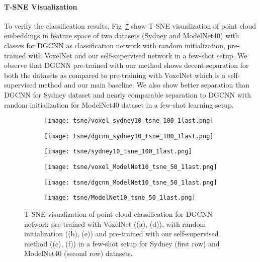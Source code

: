 \documentclass{article}
\begin{document}
\paragraph{T-SNE Visualization}
To verify the classification results, Fig~\ref{fig:tsne} show T-SNE visualization of point cloud embeddings in feature space of two datasets (Sydney and ModelNet40) with  classes for DGCNN as classification network with random initialization, pre-trained with VoxelNet and our self-supervised network in a few-shot setup. We observe that DGCNN pre-trained with our method shows decent separation for both the datasets as compared to pre-training with VoxelNet which is a self-supervised method and our main baseline. We also show better separation than DGCNN for Sydney dataset and nearly comparable separation to DGCNN with random initialization for ModelNet40 dataset in a few-shot learning setup.

\begin{figure}
	\centering
	\begin{subfigure}{.32\textwidth}
		\centering
		\texttt{[image: tsne/voxel\_sydney10\_tsne\_100\_1last.png]}
		\caption{}
		\label{fig:tsne1}
	\end{subfigure}\begin{subfigure}{.32\textwidth}
		\centering
		\texttt{[image: tsne/dgcnn\_sydney10\_tsne\_100\_1last.png]}
		\caption{}
		\label{fig:tsne2}
    \end{subfigure}\begin{subfigure}{.32\textwidth}
		\centering
		\texttt{[image: tsne/sydney10\_tsne\_100\_1last.png]}
		\caption{}
		\label{fig:tsne3}
	\end{subfigure}

	\begin{subfigure}{.32\textwidth}
		\centering
		\texttt{[image: tsne/voxel\_ModelNet10\_tsne\_50\_1last.png]}
		\caption{}
		\label{fig:tsne4}
    \end{subfigure}\begin{subfigure}{.32\textwidth}
		\centering
		\texttt{[image: tsne/dgcnn\_ModelNet10\_tsne\_50\_1last.png]}
		\caption{}
		\label{fig:tsne5}
    \end{subfigure}\begin{subfigure}{.32\textwidth}
		\centering
		\texttt{[image: tsne/ModelNet10\_tsne\_50\_1last.png]}
		\caption{}
		\label{fig:tsne6}
	\end{subfigure}\caption{T-SNE visualization of point cloud classification for DGCNN network pre-trained with VoxelNet ((a), (d)), with random initialization ((b), (e)) and pre-trained with our self-supervised method ((c), (f)) in a few-shot setup for Sydney (first row) and ModelNet40 (second row) datasets. }
	\label{fig:tsne}
\end{figure}
\end{document}
